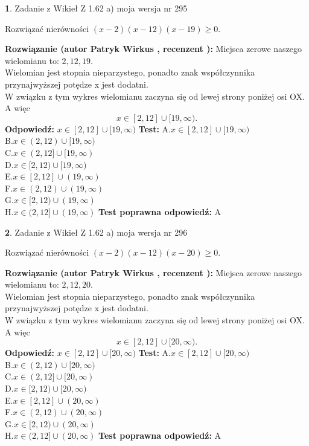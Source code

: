 \documentclass[12pt, a4paper]{article}
\theoremstyle{definition} %
\newtheorem{zad}{}
\newcommand{\zadStart}[1]{\begin{zad}#1\newline}
\newcommand{\zadStop}{\end{zad}}
\newcommand{\rozwStart}[2]{\noindent \textbf{Rozwiązanie (autor #1 , recenzent #2): }\newline}
\newcommand{\rozwStop}{\newline}
\newcommand{\odpStart}{\noindent \textbf{Odpowiedź:}\newline}
\newcommand{\odpStop}{\newline}
\newcommand{\testStart}{\noindent \textbf{Test:}\newline}
\newcommand{\testStop}{\newline}
\newcommand{\kluczStart}{\noindent \textbf{Test poprawna odpowiedź:}\newline}
\newcommand{\kluczStop}{\newline}
\begin{document}
\zadStart{Zadanie z Wikieł Z 1.62 a) moja wersja nr 295}

Rozwiązać nierówności $(x-2)(x-12)(x-19)\ge0$.
\zadStop
\rozwStart{Patryk Wirkus}{}
Miejsca zerowe naszego wielomianu to: $2, 12, 19$.\\
Wielomian jest stopnia nieparzystego, ponadto znak współczynnika przy\linebreak najwyższej potędze x jest dodatni.\\ W związku z tym wykres wielomianu zaczyna się od lewej strony poniżej osi OX. A więc $$x \in [2,12] \cup [19,\infty).$$
\rozwStop
\odpStart
$x \in [2,12] \cup [19,\infty)$
\odpStop
\testStart
A.$x \in [2,12] \cup [19,\infty)$\\
B.$x \in (2,12) \cup [19,\infty)$\\
C.$x \in (2,12] \cup [19,\infty)$\\
D.$x \in [2,12) \cup [19,\infty)$\\
E.$x \in [2,12] \cup (19,\infty)$\\
F.$x \in (2,12) \cup (19,\infty)$\\
G.$x \in [2,12) \cup (19,\infty)$\\
H.$x \in (2,12] \cup (19,\infty)$
\testStop
\kluczStart
A
\kluczStop



\zadStart{Zadanie z Wikieł Z 1.62 a) moja wersja nr 296}

Rozwiązać nierówności $(x-2)(x-12)(x-20)\ge0$.
\zadStop
\rozwStart{Patryk Wirkus}{}
Miejsca zerowe naszego wielomianu to: $2, 12, 20$.\\
Wielomian jest stopnia nieparzystego, ponadto znak współczynnika przy\linebreak najwyższej potędze x jest dodatni.\\ W związku z tym wykres wielomianu zaczyna się od lewej strony poniżej osi OX. A więc $$x \in [2,12] \cup [20,\infty).$$
\rozwStop
\odpStart
$x \in [2,12] \cup [20,\infty)$
\odpStop
\testStart
A.$x \in [2,12] \cup [20,\infty)$\\
B.$x \in (2,12) \cup [20,\infty)$\\
C.$x \in (2,12] \cup [20,\infty)$\\
D.$x \in [2,12) \cup [20,\infty)$\\
E.$x \in [2,12] \cup (20,\infty)$\\
F.$x \in (2,12) \cup (20,\infty)$\\
G.$x \in [2,12) \cup (20,\infty)$\\
H.$x \in (2,12] \cup (20,\infty)$
\testStop
\kluczStart
A
\kluczStop
\end{document}
